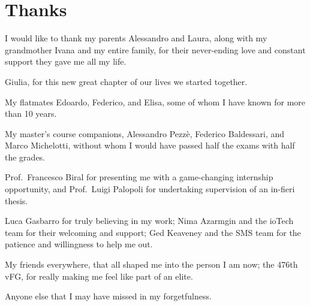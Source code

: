 
\chapter*{Thanks}

I would like to thank my parents Alessandro and Laura, along with my grandmother Ivana and my entire family, for their never-ending love and constant support they gave me all my life.

\FLOATverticalspace{12px}

Giulia, for this new great chapter of our lives we started together.

\FLOATverticalspace{12px}

My flatmates Edoardo, Federico, and Elisa, some of whom I have known for more than 10 years.

\FLOATverticalspace{12px}

My master's course companions, Alessandro Pezzè, Federico Baldessari, and Marco Michelotti, without whom I would have passed half the exams with half the grades.

\FLOATverticalspace{12px}

Prof.\ Francesco Biral for presenting me with a game-changing internship opportunity, and Prof.\ Luigi Palopoli for undertaking supervision of an in-fieri thesis.

\FLOATverticalspace{12px}

Luca Gasbarro for truly believing in my work; Nima Azarmgin and the ioTech team for their welcoming and support; Ged Keaveney and the SMS team for the patience and willingness to help me out.

\FLOATverticalspace{12px}

My friends everywhere, that all shaped me into the person I am now; the 476th vFG, for really making me feel like part of an elite.

\FLOATverticalspace{12px}

Anyone else that I may have missed in my forgetfulness.
